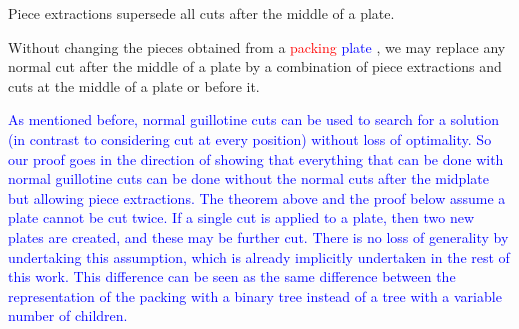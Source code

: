 \documentclass[ppgc,tese,english,formais,babel]{iiufrgs}
\newif\iffinalversion
\newcommand{\newtext}[1]{\iffinalversion%
#1%
\else%
\textcolor{blue}{#1}%
\fi%
}
\newcommand{\oldtext}[1]{\iffinalversion%
\else%
\textcolor{red}{#1}%
\fi%
}
\begin{document}
\begin{theorem}{Piece extractions supersede all cuts after the middle of a plate.}

Without changing the pieces obtained from a \oldtext{packing}\newtext{plate}, we may replace any normal cut after the middle of a plate by a combination of piece extractions and cuts at the middle of a plate or before it.
\label{the:enhanced_correctness}
\end{theorem}

\newtext{
As mentioned before, normal guillotine cuts can be used to search for a solution (in contrast to considering cut at every position) without loss of optimality.
So our proof goes in the direction of showing that everything that can be done with normal guillotine cuts can be done without the normal cuts after the midplate but allowing piece extractions.
The theorem above and the proof below assume a plate cannot be cut twice.
If a single cut is applied to a plate, then two new plates are created, and these may be further cut.
There is no loss of generality by undertaking this assumption, which is already implicitly undertaken in the rest of this work.
This difference can be seen as the same difference between the representation of the packing with a binary tree instead of a tree with a variable number of children.
}
\end{document}
